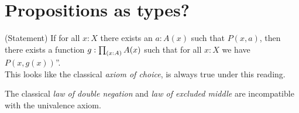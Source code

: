 \documentclass[hott-all.tex]{subfiles}
\begin{document}
\section{Propositions as types?}
\label{subsec:pat?}
%
\begin{rmk}
\label{eq:english-ac}
(Statement)
If for all $x:X$ there exists an $a:A(x)$ such that $P(x,a)$, then there exists
a function $g:\prd{x:A} A(x)$ such that for all $x:X$ we have $P(x,g(x))$''.\\

This looks like the classical \emph{axiom of
choice}, is always true under this reading.
\end{rmk}
%
\begin{rmk}
The classical \emph{law of double negation} and \emph{law of excluded middle} are incompatible with the univalence axiom.
\end{rmk}
\end{document}
